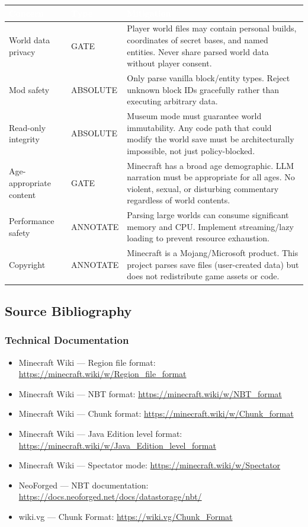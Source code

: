 \documentclass[11pt,letterpaper]{article}
\newcommand{\tableheader}[1]{\textbf{\sffamily\textcolor{white}{#1}}}
\begin{document}
\begin{center}
\begin{tabularx}{\textwidth}{L{3cm}L{3cm}X}
\toprule
{}
\tableheader{Concern} & \tableheader{Type} & \tableheader{Mitigation} \\
\midrule
World data privacy & GATE & Player world files may contain personal builds, coordinates of secret bases, and named entities. Never share parsed world data without player consent. \\
Mod safety & ABSOLUTE & Only parse vanilla block/entity types. Reject unknown block IDs gracefully rather than executing arbitrary data. \\
Read-only integrity & ABSOLUTE & Museum mode must guarantee world immutability. Any code path that could modify the world save must be architecturally impossible, not just policy-blocked. \\
Age-appropriate content & GATE & Minecraft has a broad age demographic. LLM narration must be appropriate for all ages. No violent, sexual, or disturbing commentary regardless of world contents. \\
Performance safety & ANNOTATE & Parsing large worlds can consume significant memory and CPU. Implement streaming/lazy loading to prevent resource exhaustion. \\
Copyright & ANNOTATE & Minecraft is a Mojang/Microsoft product. This project parses save files (user-created data) but does not redistribute game assets or code. \\
\bottomrule
\end{tabularx}
\end{center}

\subsection{Source Bibliography}

\subsubsection*{Technical Documentation}
\begin{itemize}[leftmargin=2em]
\item Minecraft Wiki --- Region file format: \url{https://minecraft.wiki/w/Region_file_format}
\item Minecraft Wiki --- NBT format: \url{https://minecraft.wiki/w/NBT_format}
\item Minecraft Wiki --- Chunk format: \url{https://minecraft.wiki/w/Chunk_format}
\item Minecraft Wiki --- Java Edition level format: \url{https://minecraft.wiki/w/Java_Edition_level_format}
\item Minecraft Wiki --- Spectator mode: \url{https://minecraft.wiki/w/Spectator}
\item NeoForged --- NBT documentation: \url{https://docs.neoforged.net/docs/datastorage/nbt/}
\item wiki.vg --- Chunk Format: \url{https://wiki.vg/Chunk_Format}
\end{itemize}
\end{document}
